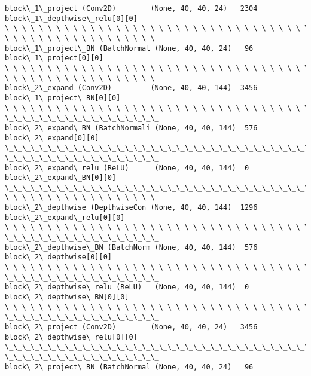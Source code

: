 \documentclass[11pt]{article}
\begin{document}
\begin{Verbatim}[commandchars=\\\{\}]
block\_1\_project (Conv2D)        (None, 40, 40, 24)   2304
block\_1\_depthwise\_relu[0][0]
\_\_\_\_\_\_\_\_\_\_\_\_\_\_\_\_\_\_\_\_\_\_\_\_\_\_\_\_\_\_\_\_\_\_\_\_\_\_\_\_\_\_\_\_\_\_\_\_\_\_\_\_\_\_\_\_\_\_\_\_\_\_\_\_\_\_\_\_\_\_\_\_\_\_\_\_\_\_\_\_
\_\_\_\_\_\_\_\_\_\_\_\_\_\_\_\_\_\_
block\_1\_project\_BN (BatchNormal (None, 40, 40, 24)   96
block\_1\_project[0][0]
\_\_\_\_\_\_\_\_\_\_\_\_\_\_\_\_\_\_\_\_\_\_\_\_\_\_\_\_\_\_\_\_\_\_\_\_\_\_\_\_\_\_\_\_\_\_\_\_\_\_\_\_\_\_\_\_\_\_\_\_\_\_\_\_\_\_\_\_\_\_\_\_\_\_\_\_\_\_\_\_
\_\_\_\_\_\_\_\_\_\_\_\_\_\_\_\_\_\_
block\_2\_expand (Conv2D)         (None, 40, 40, 144)  3456
block\_1\_project\_BN[0][0]
\_\_\_\_\_\_\_\_\_\_\_\_\_\_\_\_\_\_\_\_\_\_\_\_\_\_\_\_\_\_\_\_\_\_\_\_\_\_\_\_\_\_\_\_\_\_\_\_\_\_\_\_\_\_\_\_\_\_\_\_\_\_\_\_\_\_\_\_\_\_\_\_\_\_\_\_\_\_\_\_
\_\_\_\_\_\_\_\_\_\_\_\_\_\_\_\_\_\_
block\_2\_expand\_BN (BatchNormali (None, 40, 40, 144)  576
block\_2\_expand[0][0]
\_\_\_\_\_\_\_\_\_\_\_\_\_\_\_\_\_\_\_\_\_\_\_\_\_\_\_\_\_\_\_\_\_\_\_\_\_\_\_\_\_\_\_\_\_\_\_\_\_\_\_\_\_\_\_\_\_\_\_\_\_\_\_\_\_\_\_\_\_\_\_\_\_\_\_\_\_\_\_\_
\_\_\_\_\_\_\_\_\_\_\_\_\_\_\_\_\_\_
block\_2\_expand\_relu (ReLU)      (None, 40, 40, 144)  0
block\_2\_expand\_BN[0][0]
\_\_\_\_\_\_\_\_\_\_\_\_\_\_\_\_\_\_\_\_\_\_\_\_\_\_\_\_\_\_\_\_\_\_\_\_\_\_\_\_\_\_\_\_\_\_\_\_\_\_\_\_\_\_\_\_\_\_\_\_\_\_\_\_\_\_\_\_\_\_\_\_\_\_\_\_\_\_\_\_
\_\_\_\_\_\_\_\_\_\_\_\_\_\_\_\_\_\_
block\_2\_depthwise (DepthwiseCon (None, 40, 40, 144)  1296
block\_2\_expand\_relu[0][0]
\_\_\_\_\_\_\_\_\_\_\_\_\_\_\_\_\_\_\_\_\_\_\_\_\_\_\_\_\_\_\_\_\_\_\_\_\_\_\_\_\_\_\_\_\_\_\_\_\_\_\_\_\_\_\_\_\_\_\_\_\_\_\_\_\_\_\_\_\_\_\_\_\_\_\_\_\_\_\_\_
\_\_\_\_\_\_\_\_\_\_\_\_\_\_\_\_\_\_
block\_2\_depthwise\_BN (BatchNorm (None, 40, 40, 144)  576
block\_2\_depthwise[0][0]
\_\_\_\_\_\_\_\_\_\_\_\_\_\_\_\_\_\_\_\_\_\_\_\_\_\_\_\_\_\_\_\_\_\_\_\_\_\_\_\_\_\_\_\_\_\_\_\_\_\_\_\_\_\_\_\_\_\_\_\_\_\_\_\_\_\_\_\_\_\_\_\_\_\_\_\_\_\_\_\_
\_\_\_\_\_\_\_\_\_\_\_\_\_\_\_\_\_\_
block\_2\_depthwise\_relu (ReLU)   (None, 40, 40, 144)  0
block\_2\_depthwise\_BN[0][0]
\_\_\_\_\_\_\_\_\_\_\_\_\_\_\_\_\_\_\_\_\_\_\_\_\_\_\_\_\_\_\_\_\_\_\_\_\_\_\_\_\_\_\_\_\_\_\_\_\_\_\_\_\_\_\_\_\_\_\_\_\_\_\_\_\_\_\_\_\_\_\_\_\_\_\_\_\_\_\_\_
\_\_\_\_\_\_\_\_\_\_\_\_\_\_\_\_\_\_
block\_2\_project (Conv2D)        (None, 40, 40, 24)   3456
block\_2\_depthwise\_relu[0][0]
\_\_\_\_\_\_\_\_\_\_\_\_\_\_\_\_\_\_\_\_\_\_\_\_\_\_\_\_\_\_\_\_\_\_\_\_\_\_\_\_\_\_\_\_\_\_\_\_\_\_\_\_\_\_\_\_\_\_\_\_\_\_\_\_\_\_\_\_\_\_\_\_\_\_\_\_\_\_\_\_
\_\_\_\_\_\_\_\_\_\_\_\_\_\_\_\_\_\_
block\_2\_project\_BN (BatchNormal (None, 40, 40, 24)   96

\end{Verbatim}
\end{document}
